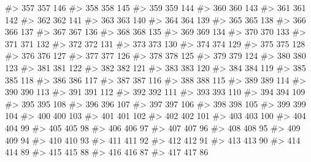 \documentclass[
  letterpaper,
  DIV=11,
  numbers=noendperiod]{scrreprt}
\newenvironment{Shaded}{\begin{snugshade}}{\end{snugshade}}
\newcommand{\CommentTok}[1]{\textcolor[rgb]{0.37,0.37,0.37}{#1}}
\begin{document}
\begin{Shaded}
\begin{Highlighting}[]
\CommentTok{\#\textgreater{} 357 357  146}
\CommentTok{\#\textgreater{} 358 358  145}
\CommentTok{\#\textgreater{} 359 359  144}
\CommentTok{\#\textgreater{} 360 360  143}
\CommentTok{\#\textgreater{} 361 361  142}
\CommentTok{\#\textgreater{} 362 362  141}
\CommentTok{\#\textgreater{} 363 363  140}
\CommentTok{\#\textgreater{} 364 364  139}
\CommentTok{\#\textgreater{} 365 365  138}
\CommentTok{\#\textgreater{} 366 366  137}
\CommentTok{\#\textgreater{} 367 367  136}
\CommentTok{\#\textgreater{} 368 368  135}
\CommentTok{\#\textgreater{} 369 369  134}
\CommentTok{\#\textgreater{} 370 370  133}
\CommentTok{\#\textgreater{} 371 371  132}
\CommentTok{\#\textgreater{} 372 372  131}
\CommentTok{\#\textgreater{} 373 373  130}
\CommentTok{\#\textgreater{} 374 374  129}
\CommentTok{\#\textgreater{} 375 375  128}
\CommentTok{\#\textgreater{} 376 376  127}
\CommentTok{\#\textgreater{} 377 377  126}
\CommentTok{\#\textgreater{} 378 378  125}
\CommentTok{\#\textgreater{} 379 379  124}
\CommentTok{\#\textgreater{} 380 380  123}
\CommentTok{\#\textgreater{} 381 381  122}
\CommentTok{\#\textgreater{} 382 382  121}
\CommentTok{\#\textgreater{} 383 383  120}
\CommentTok{\#\textgreater{} 384 384  119}
\CommentTok{\#\textgreater{} 385 385  118}
\CommentTok{\#\textgreater{} 386 386  117}
\CommentTok{\#\textgreater{} 387 387  116}
\CommentTok{\#\textgreater{} 388 388  115}
\CommentTok{\#\textgreater{} 389 389  114}
\CommentTok{\#\textgreater{} 390 390  113}
\CommentTok{\#\textgreater{} 391 391  112}
\CommentTok{\#\textgreater{} 392 392  111}
\CommentTok{\#\textgreater{} 393 393  110}
\CommentTok{\#\textgreater{} 394 394  109}
\CommentTok{\#\textgreater{} 395 395  108}
\CommentTok{\#\textgreater{} 396 396  107}
\CommentTok{\#\textgreater{} 397 397  106}
\CommentTok{\#\textgreater{} 398 398  105}
\CommentTok{\#\textgreater{} 399 399  104}
\CommentTok{\#\textgreater{} 400 400  103}
\CommentTok{\#\textgreater{} 401 401  102}
\CommentTok{\#\textgreater{} 402 402  101}
\CommentTok{\#\textgreater{} 403 403  100}
\CommentTok{\#\textgreater{} 404 404   99}
\CommentTok{\#\textgreater{} 405 405   98}
\CommentTok{\#\textgreater{} 406 406   97}
\CommentTok{\#\textgreater{} 407 407   96}
\CommentTok{\#\textgreater{} 408 408   95}
\CommentTok{\#\textgreater{} 409 409   94}
\CommentTok{\#\textgreater{} 410 410   93}
\CommentTok{\#\textgreater{} 411 411   92}
\CommentTok{\#\textgreater{} 412 412   91}
\CommentTok{\#\textgreater{} 413 413   90}
\CommentTok{\#\textgreater{} 414 414   89}
\CommentTok{\#\textgreater{} 415 415   88}
\CommentTok{\#\textgreater{} 416 416   87}
\CommentTok{\#\textgreater{} 417 417   86}

\end{Highlighting}
\end{Shaded}
\end{document}
